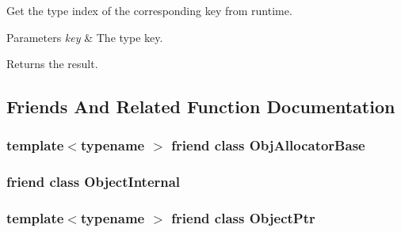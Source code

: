 Get the type index of the corresponding key from runtime. 


\begin{DoxyParams}{Parameters}
{\em key} & The type key. \\
\hline
\end{DoxyParams}
\begin{DoxyReturn}{Returns}
the result. 
\end{DoxyReturn}


\subsection{Friends And Related Function Documentation}
\subsubsection[{\texorpdfstring{Obj\+Allocator\+Base}{ObjAllocatorBase}}]{\setlength{\rightskip}{0pt plus 5cm}template$<$typename $>$ friend class {\bf Obj\+Allocator\+Base}\hspace{0.3cm}{\ttfamily [friend]}}\hypertarget{classtvm_1_1runtime_1_1Object_a8fae619f3bd1a2b2f7273d8d6525032a}{}\label{classtvm_1_1runtime_1_1Object_a8fae619f3bd1a2b2f7273d8d6525032a}
\subsubsection[{\texorpdfstring{Object\+Internal}{ObjectInternal}}]{\setlength{\rightskip}{0pt plus 5cm}friend class Object\+Internal\hspace{0.3cm}{\ttfamily [friend]}}\hypertarget{classtvm_1_1runtime_1_1Object_a4a8e2a2ce9dc9267dc18ac8abfd8dd16}{}\label{classtvm_1_1runtime_1_1Object_a4a8e2a2ce9dc9267dc18ac8abfd8dd16}
\subsubsection[{\texorpdfstring{Object\+Ptr}{ObjectPtr}}]{\setlength{\rightskip}{0pt plus 5cm}template$<$typename $>$ friend class {\bf Object\+Ptr}\hspace{0.3cm}{\ttfamily [friend]}}\hypertarget{classtvm_1_1runtime_1_1Object_a4193bb155125953e77ded93c0fb46965}{}\label{classtvm_1_1runtime_1_1Object_a4193bb155125953e77ded93c0fb46965}
